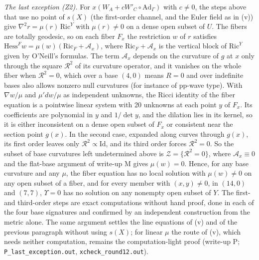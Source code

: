 \documentclass[11pt]{article}
\theoremstyle{remark}
\begin{document}
\emph{The last exception (Z2).} For $x(W_A+cW'_C\circ\mathrm{Ad}_\Gamma)$ with $c\neq0$, the steps above that use no point of $s(X)$ (the first-order channel, and the Euler field as in (v)) give $\nabla^2r=\mu(r)\,\mathrm{Ric}^Y$ with $\mu(r)\neq0$ on a dense open subset of $U$. The fibers are totally geodesic, so on each fiber $F_x$ the restriction $w$ of $r$ satisfies $\mathrm{Hess}^Fw=\mu(w)(\mathrm{Ric}_F+\mathcal A_x)$, where $\mathrm{Ric}_F+\mathcal A_x$ is the vertical block of $\mathrm{Ric}^Y$ given by O'Neill's formulas. The term $\mathcal A_x$ depends on the curvature of $g$ at $x$ only through the square $\mathcal R^2$ of its curvature operator, and it vanishes on the whole fiber when $\mathcal R^2=0$, which over a base $(4,0)$ means $R=0$ and over indefinite bases also allows nonzero null curvatures (for instance of pp-wave type). With $\nabla w/\mu$ and $\mu'dw/\mu$ as independent unknowns, the Ricci identity of the fiber equation is a pointwise linear system with 20 unknowns at each point $y$ of $F_x$. Its coefficients are polynomial in $y$ and $1/\det y$, and the dilation lies in its kernel, so it is either inconsistent on a dense open subset of $F_x$ or consistent near the section point $g(x)$. In the second case, expanded along curves through $g(x)$, its first order leaves only $\mathcal R^2\propto\mathrm{Id}$, and its third order forces $\mathcal R^2=0$. So the subset of base curvatures left undetermined above is $\mathcal Z=\{\mathcal R^2=0\}$, where $\mathcal A_x\equiv0$ and the flat-base argument of write-up M gives $\mu(w)=0$. Hence, for any base curvature and any $\mu$, the fiber equation has no local solution with $\mu(w)\neq0$ on any open subset of a fiber, and for every member with $(x,y)\neq0$, in $(14,0)$ and $(7,7)$, $\Upsilon=0$ has no solution on any nonempty open subset of $Y$. The first- and third-order steps are exact computations without hand proof, done in each of the four base signatures and confirmed by an independent construction from the metric alone. The same argument settles the line equations of (v) and of the previous paragraph without using $s(X)$; for linear $\mu$ the route of (v), which needs neither computation, remains the computation-light proof (write-up P; \texttt{P\_last\_exception.out}, \texttt{xcheck\_round12.out}).
\end{document}
